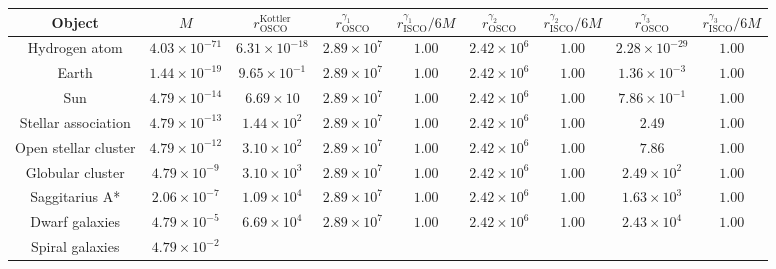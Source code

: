 \documentclass[aps,amsmath,amssymb,twocolumn]{revtex4}
\begin{document}
\begin{table*}[ht!]
\centering
\begin{tabular}{| c | c | c | c | c | c | c | c | c |} 
\hline
    Object & $M$  & $r^{\text{Kottler}}_{\text{OSCO}}$   &    $r^{\gamma_1}_{\text{OSCO}}$ & $ r^{\gamma_1}_{\text{ISCO}}/6M$ 
                         & $r^{\gamma_2}_{\text{OSCO}}$  & $ r^{\gamma_2}_{\text{ISCO}}/6M$ 
                         & $r^{\gamma_3}_{\text{OSCO}}$ & $ r^{\gamma_3}_{\text{ISCO}}/6M$  
    \\ [0.5ex] 
       \hline
    \hline
   Hydrogen atom  & $ 4.03 \times 10^{-71} $  
   & $6.31 \times 10^{-18}$
   & $2.89 \times 10^{7}$ & $1.00$ 
   & $2.42 \times 10^{6}$  &  $1.00$
   & $2.28 \times 10^{-29}$  & $1.00$
    \\ [0.5ex] 
   \hline
   Earth & $ 1.44 \times 10^{-19} $ 
   & $9.65 \times 10^{-1}$
   & $2.89 \times 10^{7}$ & $1.00$ 
   & $2.42 \times 10^{6}$  &  $1.00$
   & $1.36 \times 10^{-3}$  & $1.00$
   \\
   \hline
   Sun & $ 4.79 \times 10^{-14} $ 
   & $6.69 \times 10$
   & $2.89 \times 10^{7}$ & $1.00$ 
   & $2.42 \times 10^{6}$  &  $1.00$
   & $7.86 \times 10^{-1}$  & $1.00$
    \\
   \hline
   Stellar association & $ 4.79 \times 10^{-13} $ 
   & $1.44 \times 10^{2}$
   & $2.89 \times 10^{7}$ & $1.00$ 
   & $2.42 \times 10^{6}$  &  $1.00$
   & $2.49                     $  & $1.00$
   \\
   \hline
  Open stellar cluster & $ 4.79 \times 10^{-12} $ 
   & $3.10 \times 10^{2}$
   & $2.89 \times 10^{7}$ & $1.00$ 
   & $2.42 \times 10^{6}$  &  $1.00$
   & $7.86                     $  & $1.00$
  \\
   \hline
   Globular cluster & $ 4.79 \times 10^{-9} $
   & $3.10 \times 10^{3}$
   & $2.89 \times 10^{7}$ & $1.00$ 
   & $2.42 \times 10^{6}$  &  $1.00$
   & $2.49 \times 10^{2}$  & $1.00$
   \\
   \hline
  Saggitarius A* & $ 2.06 \times 10^{-7} $ 
   & $1.09 \times 10^{4}$
   & $2.89 \times 10^{7}$ & $1.00$ 
   & $2.42 \times 10^{6}$  &  $1.00$
   & $1.63 \times 10^{3}$  & $1.00$
  \\
   \hline
    Dwarf galaxies & $ 4.79 \times 10^{-5} $ 
   & $6.69 \times 10^{4}$
   & $2.89 \times 10^{7}$ & $1.00$ 
   & $2.42 \times 10^{6}$  &  $1.00$
   & $2.43 \times 10^{4}$  & $1.00$
    \\
   \hline
    Spiral galaxies & $ 4.79 \times 10^{-2} $ 

\end{tabular}
\end{table*}
\end{document}

